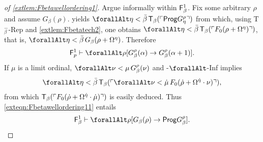 \documentclass[UKenglish,cleveref,DIV=12]{scrartcl}
\let\forall\forallAlt
\theoremstyle{definition}
\theoremstyle{definition}
\begin{document}
\begin{proof}[of \cref{extlem:Fbetawellordering1}]
Argue informally within $\mathsf{F}_\beta^1$. Fix some arbitrary $\rho$ and assume $G_\beta(\rho)$.
 yields $\forall\eta<\bar\beta\,\T_\beta(\gn{\Prog
G_\eta^\rho})$ from which, using T$^-_\beta$-Rep and \cref{extlem:Fbetatech2},
one obtains
  $\forall\eta<\bar\beta\,\T_\beta(\gn{F_0(\rho+\Omega^\eta)})$,
that is, $\forall\eta<\bar\beta\,G_\beta(\rho+\Omega^\eta)$. Therefore
\begin{align}\label{exteqn:Fbetawellordering11}
 \F_p^1\proves\forall\rho[G_\beta^\rho(\alpha)\rightarrow G_\beta^\rho(\alpha+1)].
\end{align}
If $\mu$ is a limit ordinal, $\forall\nu<\mu\,G_\beta^\rho(\nu)$ and
\textT\beta-$\forall$-Inf implies
\begin{align*}
\forall\eta<\bar\beta\,\T_\beta(\gn{\forall\nu<\dot\mu\,F_0(\dot\rho+\Omega^{\dot\eta}
\cdot\nu)}),
\end{align*}
from which $\mathsf{T}_\beta(\ulcorner{F_0(\dot\rho+\Omega^{\dot\eta}\cdot\dot\mu)}\urcorner)$ is easily
deduced. Thus \cref{exteqn:Fbetawellordering11} entails
\begin{align*}
 \F_\beta^1\proves\forall\rho[G_\beta(\rho)\rightarrow \Prog G_\beta^\rho].
\end{align*}


\end{proof}
\end{document}
